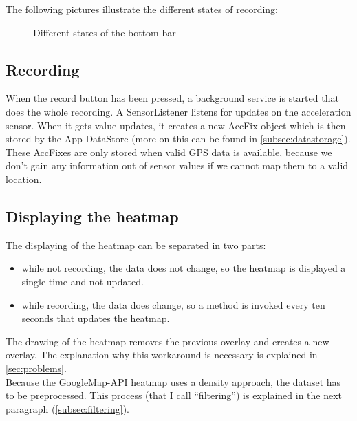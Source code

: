 \documentclass[10pt,a4paper]{article} %
\begin{document}
	The following pictures illustrate the different states of recording:


	\begin{figure}[H]
	  \centering
	  \hfill
	  \caption{Different states of the bottom bar}
	  \label{fig:bottom_bar}
	\end{figure}



	\subsection{Recording}

	When the record button has been pressed, a background service is started that does the whole recording.
	A SensorListener listens for updates on the acceleration sensor.
	When it gets value updates, it creates a new AccFix object which is then stored by the App DataStore (more on this can be found in \autoref{subsec:datastorage}).
	These AccFixes are only stored when valid GPS data is available, because we don't gain any information out of sensor values if we cannot map them to a valid location.
	
	
	\subsection{Displaying the heatmap}\label{subsec:displayheatmap}
	The displaying of the heatmap can be separated in two parts:

	\begin{itemize}
		\item while not recording, the data does not change, so the heatmap is displayed a single time and not updated.
		\item while recording, the data does change, so a method is invoked every ten seconds that updates the heatmap. 
	\end{itemize}

	\noindent
	The drawing of the heatmap removes the previous overlay and creates a new overlay.
	The explanation why this workaround is necessary is explained in \autoref{sec:problems}.\\
	Because the GoogleMap-API heatmap uses a density approach, the dataset has to be preprocessed.
	This process (that I call ``filtering'') is explained in the next paragraph (\autoref{subsec:filtering}).
	
\end{document}
